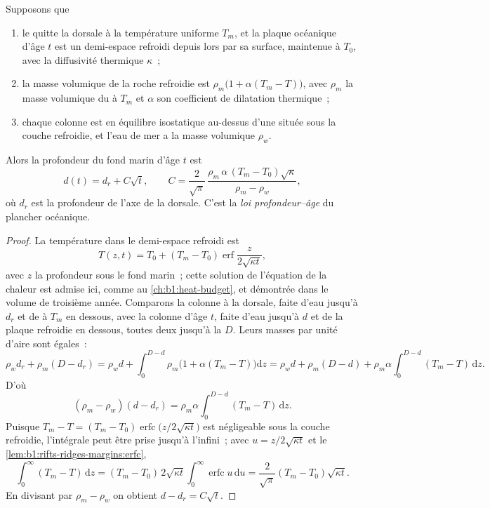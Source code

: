 \begin{theorem}\label{thm:b1:rifts-ridges-margins:depth-age}
Supposons que
\begin{enumerate}
  \item le  quitte la dorsale à la température uniforme $T_m$, et la
        plaque océanique d'âge $t$ est un demi-espace refroidi depuis lors par sa
        surface, maintenue à $T_0$, avec la diffusivité thermique $\kappa$~;
  \item la masse volumique de la roche refroidie est $\rho_m\bigl(1 + \alpha(T_m -
        T)\bigr)$, avec $\rho_m$ la masse volumique du  à $T_m$ et
        $\alpha$ son coefficient de dilatation thermique~;
  \item chaque colonne est en équilibre isostatique au-dessus d'une 
        située sous la couche refroidie, et l'eau de mer a la masse volumique $\rho_w$.
\end{enumerate}
Alors la profondeur du fond marin d'âge $t$ est
\[
  d(t) = d_r + C\sqrt t, \qquad
  C = \frac{2}{\sqrt\pi}\,\frac{\rho_m\,\alpha\,(T_m - T_0)\sqrt\kappa}{\rho_m - \rho_w},
\]
où $d_r$ est la profondeur de l'axe de la dorsale. C'est la
\emph{loi profondeur--âge} du plancher océanique.
\end{theorem}

\begin{proof}
La température dans le demi-espace refroidi est
\[
  T(z, t) = T_0 + (T_m - T_0)\operatorname{erf}\frac{z}{2\sqrt{\kappa t}},
\]
avec $z$ la profondeur sous le fond marin~; cette solution de l'équation de la chaleur est
admise ici, comme au \cref{ch:b1:heat-budget}, et démontrée dans le volume de troisième
année. Comparons la colonne à la dorsale, faite d'eau jusqu'à $d_r$ et de
 à $T_m$ en dessous, avec la colonne d'âge $t$, faite d'eau jusqu'à $d$ et
de la plaque refroidie en dessous, toutes deux jusqu'à la  $D$. Leurs masses
par unité d'aire sont égales~:
\[
  \rho_w d_r + \rho_m (D - d_r) = \rho_w d + \int_0^{D-d}\rho_m\bigl(1 + \alpha(T_m - T)\bigr)\mathrm dz
  = \rho_w d + \rho_m (D - d) + \rho_m\alpha\int_0^{D-d}(T_m - T)\,\mathrm dz.
\]
D'où
\[
  (\rho_m - \rho_w)(d - d_r) = \rho_m\alpha\int_0^{D-d}(T_m - T)\,\mathrm dz.
\]
Puisque $T_m - T = (T_m - T_0)\operatorname{erfc}\bigl(z/2\sqrt{\kappa t}\bigr)$ est
négligeable sous la couche refroidie, l'intégrale peut être prise jusqu'à l'infini~; avec
$u = z/2\sqrt{\kappa t}$ et le \cref{lem:b1:rifts-ridges-margins:erfc},
\[
  \int_0^\infty (T_m - T)\,\mathrm dz = (T_m - T_0)\,2\sqrt{\kappa t}\int_0^\infty\operatorname{erfc}u\,\mathrm du
  = \frac{2}{\sqrt\pi}(T_m - T_0)\sqrt{\kappa t}.
\]
En divisant par $\rho_m - \rho_w$ on obtient $d - d_r = C\sqrt t$.
\end{proof}

